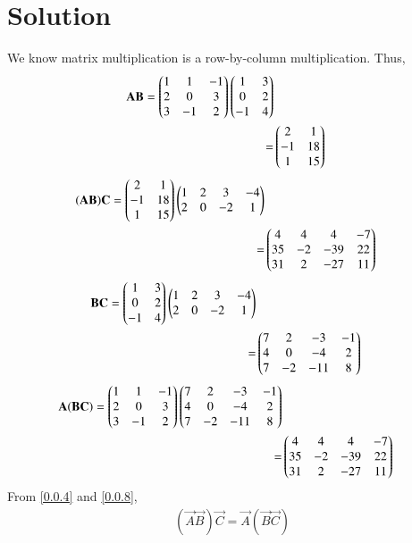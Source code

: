 \documentclass[journal,12pt,twocolumn]{IEEEtran}
\begin{document}
\section*{Solution}
We know matrix multiplication is a row-by-column multiplication. Thus,
\begin{align}
    \mathbf{A}\mathbf{B} = \begin{pmatrix}1 & 1 & -1\\2 & 0 & 3\\3 & -1 & 2\end{pmatrix}
    \begin{pmatrix}1 & 3\\0 & 2\\-1 & 4\end{pmatrix}\\
    =& \begin{pmatrix}2 & 1\\-1 & 18\\1 & 15\end{pmatrix}
\end{align}
\begin{align}
    (\mathbf{A}\mathbf{B})\mathbf{C} = \begin{pmatrix}2 & 1\\-1 & 18\\1 & 15\end{pmatrix}\begin{pmatrix}1 & 2 & 3 & -4\\2 & 0 & -2 & 1\end{pmatrix}\\
    =& \begin{pmatrix}4&4&4&-7\\35&-2&-39&22\\31&2&-27&11\end{pmatrix}\label{0.0.4}
\end{align}
\begin{align}    
    \mathbf{B}\mathbf{C} = \begin{pmatrix}1 & 3\\0 & 2\\-1 & 4\end{pmatrix}\begin{pmatrix}1 & 2 & 3 & -4\\2 & 0 & -2 & 1\end{pmatrix}\\
    =& \begin{pmatrix}7&2&-3&-1\\4&0&-4&2\\7&-2&-11&8\end{pmatrix}
\end{align}
\begin{align} 
    \mathbf{A}(\mathbf{B}\mathbf{C}) = \begin{pmatrix}1 & 1 & -1\\2 & 0 & 3\\3 & -1 & 2\end{pmatrix}\begin{pmatrix}7&2&-3&-1\\4&0&-4&2\\7&-2&-11&8\end{pmatrix}\\
    =& \begin{pmatrix}4&4&4&-7\\35&-2&-39&22\\31&2&-27&11\end{pmatrix}\label{0.0.8}
\end{align}
From \eqref{0.0.4} and \eqref{0.0.8},\\
\begin{align}
    (\vec{A}\vec{B})\vec{C}=\vec{A}(\vec{B}\vec{C})
\end{align}
\end{document}
